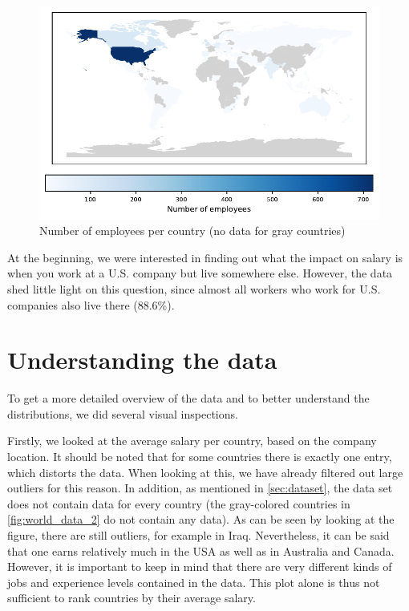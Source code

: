 \documentclass{article}
\begin{document}
\begin{figure}
\centering
\caption{Number of employees per country (no data for gray countries)}
\label{fig:world_data}
\includegraphics[scale=0.85]{fig/world_employee_residence.pdf}
\end{figure}

At the beginning, we were interested in finding out what the impact on salary is when you work at a U.S. company but live somewhere else. However, the data shed little light on this question, since almost all workers who work for U.S. companies also live there (88.6\%).

\section{Understanding the data}
To get a more detailed overview of the data and to better understand the distributions, we did several visual inspections. 

Firstly, we looked at the average salary per country, based on the company location. It should be noted that for some countries there is exactly one entry, which distorts the data. When looking at this, we have already filtered out large outliers for this reason. In addition, as mentioned in \autoref{sec:dataset}, the data set does not contain data for every country (the gray-colored countries in \autoref{fig:world_data_2} do not contain any data). As can be seen by looking at the figure, there are still outliers, for example in Iraq. Nevertheless, it can be said that one earns relatively much in the USA as well as in Australia and Canada. However, it is important to keep in mind that there are very different kinds of jobs and experience levels contained in the data. This plot alone is thus not sufficient to rank countries by their average salary.
\end{document}
